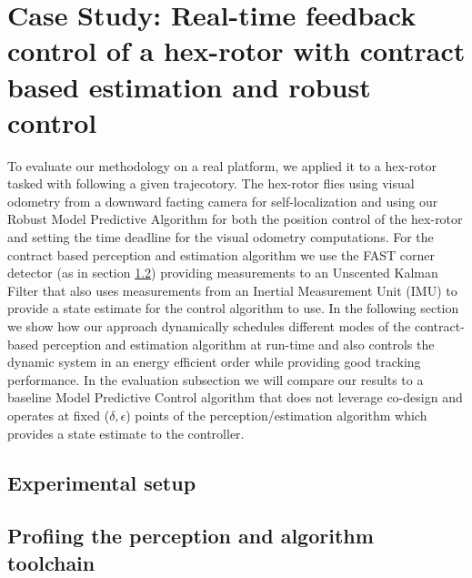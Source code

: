 \section{Case Study: Real-time feedback control of a hex-rotor with contract based estimation and robust control}
\label{experiments}

To evaluate our methodology on a real platform, we applied it to a hex-rotor tasked with following a given trajecotory. The hex-rotor flies using visual odometry from a downward facting camera for self-localization and using our Robust Model Predictive Algorithm for both the position control of the hex-rotor and setting the time deadline for the visual odometry computations. For the contract based perception and estimation algorithm we use the FAST corner detector (as in section \ref{}) providing measurements to an Unscented Kalman Filter that also uses measurements from an Inertial Measurement Unit (IMU) to provide a state estimate for the control algorithm to use.
In the following section we show how our approach dynamically schedules different modes of the contract-based perception and estimation algorithm at run-time and also controls the dynamic system in an energy efficient order while providing good tracking performance. In the evaluation subsection we will compare our results to a baseline Model Predictive Control algorithm that does not leverage co-design and operates at fixed ($\delta,\epsilon$) points of the perception/estimation algorithm which provides a state estimate to the controller. 

\subsection{Experimental setup}



\subsection{Profiing the perception and algorithm toolchain}

